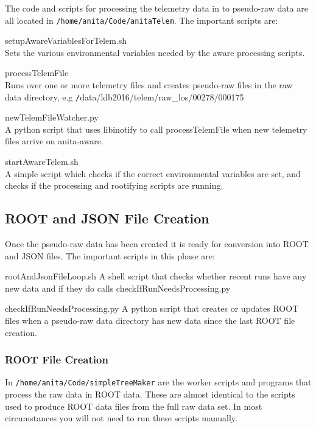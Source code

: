 \documentclass{article}
\begin{document}
The code and scripts for processing the telemetry data in to pseudo-raw data are all located in {\tt /home/anita/Code/anitaTelem}. The important scripts are:
\begin{description}
\item{setupAwareVariablesForTelem.sh} \\Sets the various environmental variables needed by the aware processing scripts.
\item{processTelemFile} \\Runs over one or more telemetry files and creates pseudo-raw files in the raw data directory, e.g  {\texttt /data/ldb2016/telem/raw\_los/00278/000175}
\item{newTelemFileWatcher.py} \\A python script that uses libinotify to call processTelemFile when new telemetry files arrive on anita-aware.
\item{startAwareTelem.sh} \\A simple script which checks if the correct environmental variables are set, and checks if the processing and rootifying scripts are running.
\end{description}

\subsection{ROOT and JSON File Creation}
Once the pseudo-raw data has been created it is ready for conversion into ROOT and JSON files. The important scripts in this phase are:
\begin{description}
\item{rootAndJsonFileLoop.sh} A shell script that checks whether recent runs have any new data and if they do calls checkIfRunNeedsProcessing.py
\item{checkIfRunNeedsProcessing.py} A python script that creates or updates ROOT files when a pseudo-raw data directory has new data since the last ROOT file creation.
\end{description}

\subsubsection{ROOT File Creation}
In {\tt /home/anita/Code/simpleTreeMaker} are the worker scripts and programs that process the raw data in ROOT data. These are almost identical to the scripts used to produce ROOT data files from the full raw data set. In most circumstances you will not need to run these scripts manually.
\end{document}

